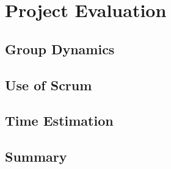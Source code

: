 \chapter{Project Evaluation}

\section{Group Dynamics}

\section{Use of Scrum}

\section{Time Estimation}

\section{Summary}


